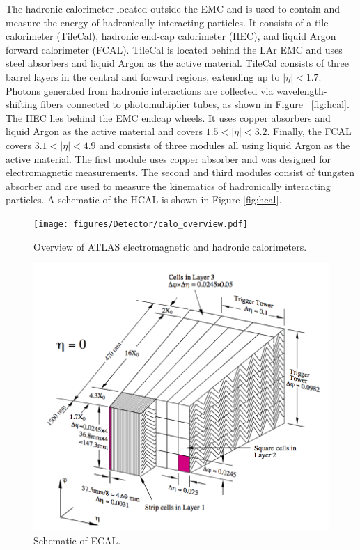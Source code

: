 The hadronic calorimeter located outside the EMC and is used to contain and measure the energy of hadronically interacting particles. It consists of a tile calorimeter (TileCal), hadronic end-cap calorimeter (HEC), and liquid Argon forward calorimeter (FCAL). TileCal is located behind the LAr EMC and uses steel absorbers and liquid Argon as the active material. TileCal consists of three barrel layers in the central and forward regions, extending up to $|\eta| < 1.7$. Photons generated from hadronic interactions are collected via wavelength-shifting fibers connected to photomultiplier tubes, as shown in Figure ~\ref{fig:hcal}. The HEC lies behind the EMC endcap wheels. It uses copper absorbers and liquid Argon as the active material and covers $1.5 < |\eta| < 3.2$. Finally, the FCAL covers $3.1 < |\eta| < 4.9$ and consists of three modules all using liquid Argon as the active material. The first module uses copper absorber and was designed for electromagnetic measurements. The second and third modules consist of tungsten absorber and are used to measure the kinematics of hadronically interacting particles. A schematic of the HCAL is shown in Figure \ref{fig:hcal}. 

\begin{figure}[h!]
  \centering
  \texttt{[image: figures/Detector/calo\_overview.pdf]}
  \caption{Overview of ATLAS electromagnetic and hadronic calorimeters.} 
  \label{fig:calo_overview}
\end{figure}
\FloatBarrier


\begin{figure}[h!]
  \centering
  \includegraphics[width=\hsize]{figures/Detector/ecal.pdf}
  \caption{Schematic of ECAL.} 
  \label{fig:ecal}
\end{figure}
\FloatBarrier




